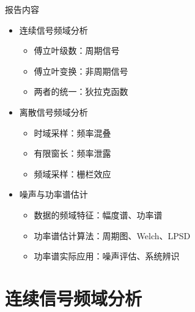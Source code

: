 \documentclass[UTF8]{ctexbeamer}
\begin{document}
\begin{frame}{报告内容}
    \begin{itemize}
        \setlength\itemsep{7pt}
        \item[$\color{darkblue}\bullet$] {\color{darkblue} 连续信号频域分析}
        \begin{itemize}
            \item 傅立叶级数：周期信号
            \item 傅立叶变换：非周期信号
            \item 两者的统一：狄拉克函数
        \end{itemize}

        \item[$\color{darkblue}\bullet$] {\color{darkblue} 离散信号频域分析}
        \begin{itemize}
            \item 时域采样：频率混叠
            \item 有限窗长：频率泄露
            \item 频域采样：栅栏效应
        \end{itemize}

        \item[$\color{darkblue}\bullet$] {\color{darkblue} 噪声与功率谱估计}
        \begin{itemize}
            \item 数据的频域特征：幅度谱、功率谱
            \item 功率谱估计算法：周期图、Welch、LPSD
            \item 功率谱实际应用：噪声评估、系统辨识
        \end{itemize}
    \end{itemize}
\end{frame}




\section{连续信号频域分析}
\end{document}
